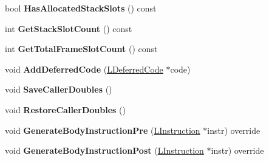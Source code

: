 \begin{DoxyCompactItemize}
\item 
bool {\bfseries Has\+Allocated\+Stack\+Slots} () const \hypertarget{classv8_1_1internal_1_1_l_code_gen_a6a5091a94d97298722ad3509d6fa41ab}{}\label{classv8_1_1internal_1_1_l_code_gen_a6a5091a94d97298722ad3509d6fa41ab}

\item 
int {\bfseries Get\+Stack\+Slot\+Count} () const \hypertarget{classv8_1_1internal_1_1_l_code_gen_ae997141e779eee569145e6d5f4326745}{}\label{classv8_1_1internal_1_1_l_code_gen_ae997141e779eee569145e6d5f4326745}

\item 
int {\bfseries Get\+Total\+Frame\+Slot\+Count} () const \hypertarget{classv8_1_1internal_1_1_l_code_gen_a7e0a34008896a2d4d09dab6f216df9cc}{}\label{classv8_1_1internal_1_1_l_code_gen_a7e0a34008896a2d4d09dab6f216df9cc}

\item 
void {\bfseries Add\+Deferred\+Code} (\hyperlink{classv8_1_1internal_1_1_l_deferred_code}{L\+Deferred\+Code} $\ast$code)\hypertarget{classv8_1_1internal_1_1_l_code_gen_a136807d3acd05ca71821c19ab49ef581}{}\label{classv8_1_1internal_1_1_l_code_gen_a136807d3acd05ca71821c19ab49ef581}

\item 
void {\bfseries Save\+Caller\+Doubles} ()\hypertarget{classv8_1_1internal_1_1_l_code_gen_a668f6d1f7c5aaf43fbfce22898808064}{}\label{classv8_1_1internal_1_1_l_code_gen_a668f6d1f7c5aaf43fbfce22898808064}

\item 
void {\bfseries Restore\+Caller\+Doubles} ()\hypertarget{classv8_1_1internal_1_1_l_code_gen_a094ae8da5b8b7b7d12990d25a4db2272}{}\label{classv8_1_1internal_1_1_l_code_gen_a094ae8da5b8b7b7d12990d25a4db2272}

\item 
void {\bfseries Generate\+Body\+Instruction\+Pre} (\hyperlink{classv8_1_1internal_1_1_l_instruction}{L\+Instruction} $\ast$instr) override\hypertarget{classv8_1_1internal_1_1_l_code_gen_a85d4251ce8010cd6b04358d6f54e1d13}{}\label{classv8_1_1internal_1_1_l_code_gen_a85d4251ce8010cd6b04358d6f54e1d13}

\item 
void {\bfseries Generate\+Body\+Instruction\+Post} (\hyperlink{classv8_1_1internal_1_1_l_instruction}{L\+Instruction} $\ast$instr) override\hypertarget{classv8_1_1internal_1_1_l_code_gen_aad9fc88d51d97648fb770f64ef370b57}{}\label{classv8_1_1internal_1_1_l_code_gen_aad9fc88d51d97648fb770f64ef370b57}


\end{DoxyCompactItemize}
